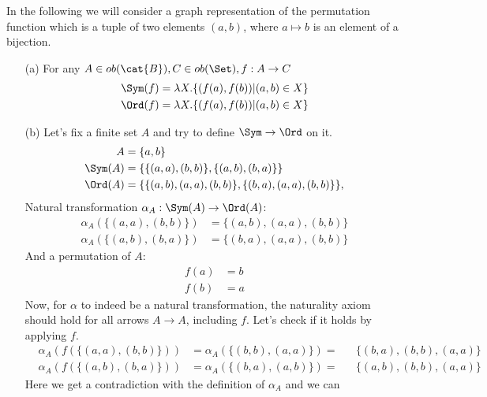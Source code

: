 \begin{answer}
  In the following we will consider a graph representation of the permutation
  function which is a tuple of two elements $(a, b)$, where $a \mapsto b$ is an
  element of a bijection.
  \begin{itemize}
    \item[(a)]
      For any $A \in ob(\cat{B}), C \in ob(\Set), f: A \to C$
      \begin{align*}
        \Sym(f) &= \lambda X. \{(f(a), f(b)) | (a, b) \in X \}\\
        \Ord(f) &= \lambda X. \{(f(a), f(b)) | (a, b) \in X \}\\
      \end{align*}
    \item[(b)]
      Let's fix a finite set $A$ and try to define $\Sym \to \Ord$ on it.\\
      \begin{align*}
        A &= \{a, b\}\\
        \Sym(A) &= \{\{(a, a), (b, b)\}, \{(a, b), (b, a)\}\}\\
        \Ord(A) &= \{\{(a, b), (a, a), (b, b)\}, \{(b, a), (a, a), (b, b)\}\},\\
      \end{align*}
      Natural transformation $\alpha_A: \Sym(A) \to \Ord(A)$:\\
      \begin{align*}
        \alpha_A(\{(a, a), (b, b)\}) &= \{(a, b), (a, a), (b, b)\}\\
        \alpha_A(\{(a, b), (b, a)\}) &= \{(b, a), (a, a), (b, b)\}
      \end{align*}
      And a permutation of $A$:
      \begin{align*}
        f(a) &= b\\
        f(b) &= a
      \end{align*}
      Now, for $\alpha$ to indeed be a natural transformation, the  naturality
      axiom should hold for all arrows $A \to A$, including $f$. Let's check if
      it holds by applying $f$.\\
      \begin{align*}
        &\alpha_A(f(\{(a, a), (b, b)\})) &= \alpha_A(\{(b, b), (a, a)\}) =&& \{(b, a), (b, b), (a, a)\}\\
        &\alpha_A(f(\{(a, b), (b, a)\})) &= \alpha_A(\{(b, a), (a, b)\}) =&& \{(a, b), (b, b), (a, a)\}
      \end{align*}
      Here we get a contradiction with the definition of $\alpha_A$ and we can

\end{itemize}
\end{answer}
